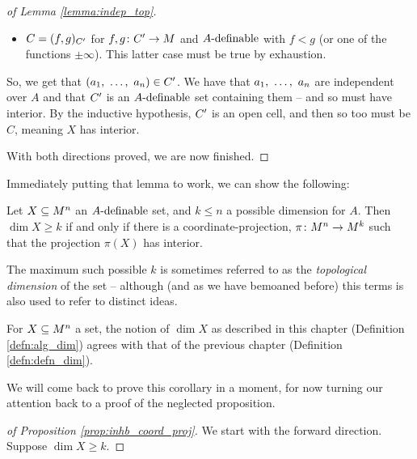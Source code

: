 \begin{proof}[of Lemma \ref{lemma:indep_top}]
\begin{itemize}
      \item $C = (f, g)_{\pri{C}}$ for $\funcdom{f,g}{\pri{C}}{M}$ \cont and $\Adefnb$ with $f < g$ (or one of the functions $\pm \infty$). This latter case must be true by exhaustion.
    \end{itemize}
  So, we get that $(\vonevm{a}{n}) \in \pri{C}$. We have that $\vonevm{a}{n}$ are independent over $A$ and that $\pri{C}$ is an $\Adefnb$ set containing them -- and so must have interior. By the inductive hypothesis, $\pri{C}$ is an open cell, and then so too must be $C$, meaning $X$ has \inhb interior.

  With both directions proved, we are now finished.
  \smartqed
\end{proof}

Immediately putting that lemma to work, we can show the following:
\begin{proposition}
  Let $\XMn[X]{n}$ an $\Adefnb$ set, and $k \leq n$ a possible dimension for $A$. Then $\dim{X} \geq k$ if and only if there is a coordinate-projection, $\funcdom{\pi}{M^n}{M^k}$ such that the projection $\pi(X)$ has \inhb interior.
  \label{prop:inhb_coord_proj}
\end{proposition}

\begin{remark}
  The maximum such possible $k$ is sometimes referred to as the \emph{topological dimension} of the set -- although (and as we have bemoaned before) this terms is also used to refer to distinct ideas.
\end{remark}

\begin{corollary}
  For $\XMn[X]{n}$ a  set, the notion of $\dim{X}$ as described in this chapter (Definition \ref{defn:alg_dim}) agrees with that of the previous chapter (Definition \ref{defn:defn_dim}).
  \label{cor:dim_agree}
\end{corollary}

We will come back to prove this corollary in a moment, for now turning our attention back to a proof of the neglected proposition.
\begin{proof}[of Proposition \ref{prop:inhb_coord_proj}]
  We start with the forward direction. Suppose $\dim{X} \geq k$.
\end{proof}

